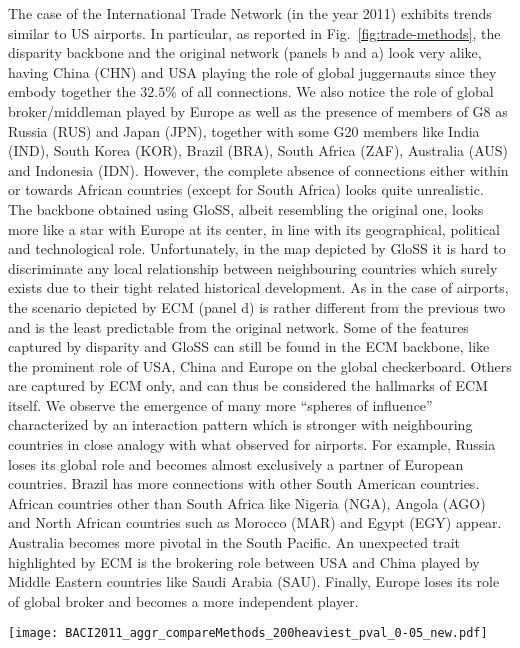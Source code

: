 \documentclass[aps,twocolumn,superscriptaddress]{revtex4-1}
\newcommand{\gloss}{GloSS }
\begin{document}
The case of the International Trade Network (in the year 2011) exhibits trends similar to US airports. In particular, as reported in Fig.~\ref{fig:trade-methods}, the disparity backbone and the original network (panels b and a) look very alike, having China (CHN) and USA playing the role of global juggernauts since they embody together the $32.5 \%$ of all connections. We also notice the role of global broker/middleman played by Europe as well as the presence of members of G8 as Russia (RUS) and Japan (JPN), together with some G20 members like India (IND), South Korea (KOR), Brazil (BRA), South Africa (ZAF), Australia (AUS) and Indonesia (IDN). 
However, the complete absence of connections either within or towards African countries (except for South Africa) looks quite unrealistic. 
The backbone obtained using GloSS, albeit resembling the original one, looks more like a star with Europe at its center, in line with its geographical, political and technological role. Unfortunately, in the map depicted by \gloss it is hard to discriminate any local relationship between neighbouring countries which surely exists due to their tight related historical development. 
As in the case of airports, the scenario depicted by ECM (panel d) is rather different from the previous two and is the least predictable from the original network. Some of the features captured by disparity and \gloss can still be found in the ECM backbone, like the prominent role of USA, China and Europe on the global checkerboard. Others are captured by ECM only, and can thus be considered the hallmarks of ECM itself. We observe the emergence of many more ``spheres of influence'' characterized by an interaction pattern which is stronger with neighbouring countries in close analogy with what observed for airports. For example, Russia loses its global role and becomes almost exclusively a partner of European countries. Brazil has more connections with other South American countries. African countries other than South Africa like Nigeria (NGA), Angola (AGO) and North African countries such as Morocco (MAR) and Egypt (EGY) appear. Australia becomes more pivotal in the South Pacific.
An unexpected trait highlighted by ECM is the brokering role between USA and China played by Middle Eastern countries like Saudi Arabia (SAU). Finally, Europe loses its role of global broker and becomes a more independent player.
%
\begin{figure*}[t]
\centering
\texttt{[image: BACI2011\_aggr\_compareMethods\_200heaviest\_pval\_0-05\_new.pdf]}
%
\caption{Filtered backbones for the International Trade Networks network in year 2011. In each map, we display the top 200 heaviest connections for the original (a), disparity (b), \gloss (c) and ECM (d) networks. All the filtered backbones have been obtained using a $p$-value, $\widetilde{\gamma}$, equal to 0.05.}
\label{fig:trade-methods}
\end{figure*}
\end{document}
